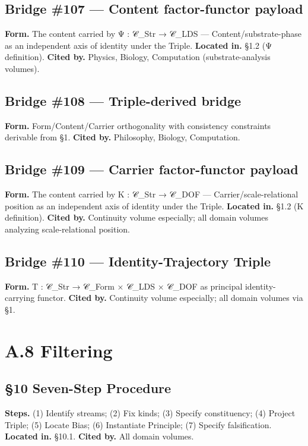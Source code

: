 \documentclass[11pt, openany]{book}
\newcommand{\sectionbreak}{\clearpage}
\begin{document}
\subsection{Bridge \#107 --- Content factor-functor payload}
\textbf{Form.} The content carried by Ψ : 𝒞\_\allowbreak{}Str → 𝒞\_\allowbreak{}LDS --- Content/substrate-phase as an independent axis of identity under the Triple.
\textbf{Located in.} §1.2 (Ψ definition).
\textbf{Cited by.} Physics, Biology, Computation (substrate-analysis volumes).

\subsection{Bridge \#108 --- Triple-derived bridge}
\textbf{Form.} Form/Content/Carrier orthogonality with consistency constraints derivable from §1.
\textbf{Cited by.} Philosophy, Biology, Computation.

\subsection{Bridge \#109 --- Carrier factor-functor payload}
\textbf{Form.} The content carried by Κ : 𝒞\_\allowbreak{}Str → 𝒞\_\allowbreak{}DOF --- Carrier/scale-relational position as an independent axis of identity under the Triple.
\textbf{Located in.} §1.2 (Κ definition).
\textbf{Cited by.} Continuity volume especially; all domain volumes analyzing scale-relational position.

\subsection{Bridge \#110 --- Identity-Trajectory Triple}
\textbf{Form.} T : 𝒞\_\allowbreak{}Str → 𝒞\_\allowbreak{}Form × 𝒞\_\allowbreak{}LDS × 𝒞\_\allowbreak{}DOF as principal identity-carrying functor.
\textbf{Cited by.} Continuity volume especially; all domain volumes via §1.

\sectionbreak

\section{A.8 Filtering}

\subsection{§10 Seven-Step Procedure}
\textbf{Steps.} (1) Identify streams; (2) Fix kinds; (3) Specify constituency; (4) Project Triple; (5) Locate Bias; (6) Instantiate Principle; (7) Specify falsification.
\textbf{Located in.} §10.1.
\textbf{Cited by.} All domain volumes.
\end{document}
